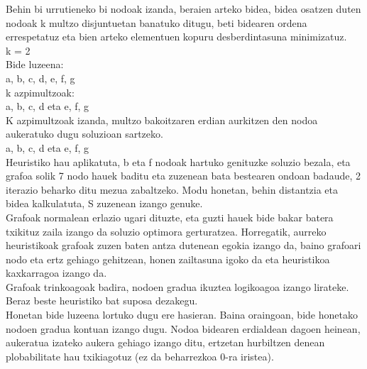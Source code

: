 \documentclass[eu,gi]{ifirak}\usepackage[]{graphicx}\usepackage[]{color}
\begin{document}
Behin bi urrutieneko bi nodoak izanda, beraien arteko bidea, bidea osatzen duten nodoak k multzo disjuntuetan banatuko ditugu, beti bidearen ordena errespetatuz eta bien arteko elementuen kopuru desberdintasuna minimizatuz.\\
\hspace*{2cm}	    k = 2\\
\hspace*{2cm} 		Bide luzeena:\\
\hspace*{3cm}				{a, b, c, d, e, f, g}\\
\hspace*{2cm}		k azpimultzoak:\\
\hspace*{3cm}				{a, b, c, d} eta {e, f, g}\\

K azpimultzoak izanda, multzo bakoitzaren erdian aurkitzen den nodoa aukeratuko dugu soluzioan sartzeko.\\

\hspace*{2cm}		{a, b, c, d} eta {e, f, g}\\

Heuristiko hau aplikatuta, b eta f nodoak hartuko genituzke soluzio bezala, eta grafoa solik 7 nodo hauek baditu eta zuzenean bata bestearen ondoan badaude, 2 iterazio beharko ditu mezua zabaltzeko.
Modu honetan, behin distantzia eta bidea kalkulatuta, S zuzenean izango genuke. \\

Grafoak normalean erlazio ugari dituzte, eta guzti hauek bide bakar batera txikituz zaila izango da soluzio optimora gerturatzea. Horregatik, aurreko heuristikoak grafoak zuzen baten antza dutenean egokia izango da, baino grafoari nodo eta ertz gehiago gehitzean, honen zailtasuna igoko da eta heuristikoa kaxkarragoa izango da.\\

Grafoak trinkoagoak badira, nodoen gradua ikuztea logikoagoa izango lirateke. Beraz beste heuristiko bat suposa dezakegu.\\

Honetan bide luzeena lortuko dugu ere hasieran. Baina oraingoan, bide honetako nodoen gradua kontuan izango dugu. Nodoa bidearen erdialdean dagoen heinean,  aukeratua izateko aukera gehiago izango ditu, ertzetan hurbiltzen denean plobabilitate hau txikiagotuz (ez da beharrezkoa 0-ra iristea).\\
	
\end{document}
